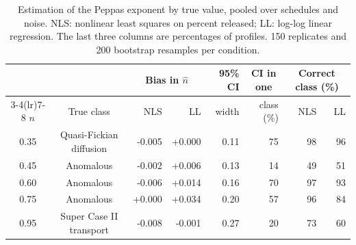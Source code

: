 \begin{table}[t]
\centering
\small
\caption{Estimation of the Peppas exponent by true value, pooled over schedules and noise. NLS: nonlinear least squares on percent released; LL: log-log linear regression. The last three columns are percentages of profiles. 150 replicates and 200 bootstrap resamples per condition.}
\label{tab:mech}
\begin{tabular}{ccrrrrrr}
\toprule
& & \multicolumn{2}{c}{Bias in $\hat n$} & 95\% CI & \multicolumn{1}{c}{CI in one} & \multicolumn{2}{c}{Correct class (\%)} \\
\cmidrule(lr){3-4}\cmidrule(lr){7-8}
$n$ & True class & NLS & LL & width & class (\%) & NLS & LL \\
\midrule
0.35 & Quasi-Fickian diffusion & -0.005 & +0.000 & 0.11 & 75 & 98 & 96 \\
0.45 & Anomalous & -0.002 & +0.006 & 0.13 & 14 & 49 & 51 \\
0.60 & Anomalous & -0.006 & +0.014 & 0.16 & 70 & 97 & 93 \\
0.75 & Anomalous & +0.000 & +0.034 & 0.20 & 57 & 96 & 84 \\
0.95 & Super Case II transport & -0.008 & -0.001 & 0.27 & 20 & 73 & 60 \\
\bottomrule
\end{tabular}
\end{table}

